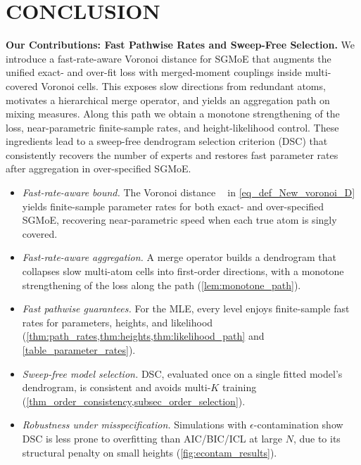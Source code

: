 \documentclass[twoside]{article}
\DeclareMathOperator*{\VD}{D_{V}}
\theoremstyle{plain}
\theoremstyle{definition}
\theoremstyle{plain}
\begin{document}
\iffalse
\section{CONCLUSION}
\label{sec_conclusion}


{\bf Our Contributions: Fast Pathwise Rates and Sweep-Free Selection.} We introduce a fast-rate-aware Voronoi distance for SGMoE that augments the unified exact- and over-fit loss with merged-moment couplings inside multi-covered Voronoi cells. This exposes slow directions from redundant atoms, motivates a hierarchical merge operator, and yields an aggregation path on mixing measures. Along this path we obtain a monotone strengthening of the loss, near-parametric finite-sample rates, and height-likelihood control. These ingredients lead to a sweep-free dendrogram selection criterion (DSC) that consistently recovers the number of experts and restores fast parameter rates after aggregation in over-specified SGMoE.
\begin{itemize}\itemsep0pt
\item {\it Fast-rate-aware bound.} The Voronoi distance \(\VD\) in \cref{eq_def_New_voronoi_D} yields finite-sample parameter rates for both exact- and over-specified SGMoE, recovering near-parametric speed when each true atom is singly covered.

\item {\it Fast-rate-aware aggregation.} A merge operator builds a dendrogram that collapses slow multi-atom cells into first-order directions, with a monotone strengthening of the loss along the path (\cref{lem:monotone_path}).

\item {\it Fast pathwise guarantees.} For the MLE, every level enjoys finite-sample fast rates for parameters, heights, and likelihood (\cref{thm:path_rates,thm:heights,thm:likelihood_path} and \cref{table_parameter_rates}).

\item {\it Sweep-free model selection.} DSC, evaluated once on a single fitted model’s dendrogram, is consistent and avoids multi-\(K\) training (\cref{thm_order_consistency,subsec_order_selection}).

\item {\it Robustness under misspecification.} Simulations with \(\epsilon\)-contamination show DSC is less prone to overfitting than AIC/BIC/ICL at large \(N\), due to its structural penalty on small heights (\cref{fig:econtam_results}).
\end{itemize}
\end{document}
